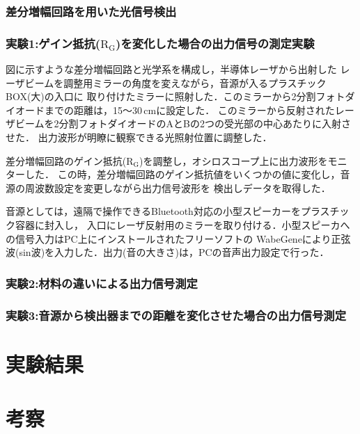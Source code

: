 \documentclass{ltjsarticle}
\begin{document}
		\subsubsection{差分増幅回路を用いた光信号検出}
			\subsubsection{実験1:ゲイン抵抗($\mathrm{R_G}$)を変化した場合の出力信号の測定実験}
				
				図に示すような差分増幅回路と光学系を構成し，半導体レーザから出射した
				レーザビームを調整用ミラーの角度を変えながら，音源が入るプラスチックBOX(大)の入口に
				取り付けたミラーに照射した．このミラーから2分割フォトダイオードまでの距離は，15～30\,cmに設定した．
				このミラーから反射されたレーザビームを2分割フォトダイオードのAとBの2つの受光部の中心あたりに入射させた．
				出力波形が明瞭に観察できる光照射位置に調整した．

				差分増幅回路のゲイン抵抗($\mathrm{R_G}$)を調整し，オシロスコープ上に出力波形をモニターした．
				この時，差分増幅回路のゲイン抵抗値をいくつかの値に変化し，音源の周波数設定を変更しながら出力信号波形を
				検出しデータを取得した．

				音源としては，遠隔で操作できるBluetooth対応の小型スピーカーをプラスチック容器に封入し，
				入口にレーザ反射用のミラーを取り付ける．小型スピーカへの信号入力はPC上にインストールされたフリーソフトの
				WabeGeneにより正弦波(sin波)を入力した．出力(音の大きさ)は，PCの音声出力設定で行った．
				
			\subsubsection{実験2:材料の違いによる出力信号測定}
			\subsubsection{実験3:音源から検出器までの距離を変化させた場合の出力信号測定}
\section{実験結果}
\section{考察}
\begin{thebibliography}{99}

\end{thebibliography}
\end{document}
